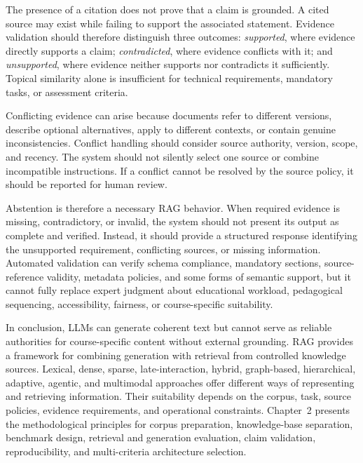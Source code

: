 \documentclass[12pt,a4paper]{report}
\numberwithin{equation}{chapter}
\begin{document}
The presence of a citation does not prove that a claim is grounded. A cited source may exist while failing to support the associated statement. Evidence validation should therefore distinguish three outcomes: \textit{supported}, where evidence directly supports a claim; \textit{contradicted}, where evidence conflicts with it; and \textit{unsupported}, where evidence neither supports nor contradicts it sufficiently. Topical similarity alone is insufficient for technical requirements, mandatory tasks, or assessment criteria.

Conflicting evidence can arise because documents refer to different versions, describe optional alternatives, apply to different contexts, or contain genuine inconsistencies. Conflict handling should consider source authority, version, scope, and recency. The system should not silently select one source or combine incompatible instructions. If a conflict cannot be resolved by the source policy, it should be reported for human review.

Abstention is therefore a necessary RAG behavior. When required evidence is missing, contradictory, or invalid, the system should not present its output as complete and verified. Instead, it should provide a structured response identifying the unsupported requirement, conflicting sources, or missing information. Automated validation can verify schema compliance, mandatory sections, source-reference validity, metadata policies, and some forms of semantic support, but it cannot fully replace expert judgment about educational workload, pedagogical sequencing, accessibility, fairness, or course-specific suitability.

In conclusion, LLMs can generate coherent text but cannot serve as reliable authorities for course-specific content without external grounding. RAG provides a framework for combining generation with retrieval from controlled knowledge sources. Lexical, dense, sparse, late-interaction, hybrid, graph-based, hierarchical, adaptive, agentic, and multimodal approaches offer different ways of representing and retrieving information. Their suitability depends on the corpus, task, source policies, evidence requirements, and operational constraints. Chapter~2 presents the methodological principles for corpus preparation, knowledge-base separation, benchmark design, retrieval and generation evaluation, claim validation, reproducibility, and multi-criteria architecture selection.

\end{document}
